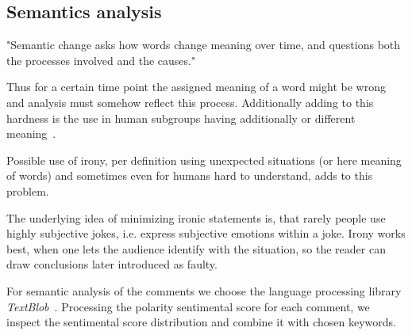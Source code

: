 \documentclass[runningheads,a4paper]{llncs}
\begin{document}
	\subsection{Semantics analysis}\label{sub:semantic}
	\begin{displayquote}
		"Semantic change asks how words change meaning over time, and questions both the processes involved and the causes."~\cite[p.2]{bouss2013}
	\end{displayquote}
	Thus for a certain time point the assigned meaning of a word might be wrong and analysis must somehow reflect this process. Additionally adding to this hardness is the use in human subgroups having additionally or different meaning~\cite[p.]{bouss2013}.\par
	Possible use of irony, per definition using unexpected situations (or here meaning of words) and sometimes even for humans hard to understand, adds to this problem.\par
	The underlying idea of minimizing ironic statements is, that rarely people use highly subjective jokes, i.e. express subjective emotions within a joke. Irony works best, when one lets the audience identify with the situation, so the reader can draw conclusions later introduced as faulty.\par
	For semantic analysis of the comments we choose the language processing library \textit{TextBlob}~\cite{textblob}. Processing the polarity sentimental score for each comment, we inspect the sentimental score distribution and combine it with chosen keywords.
\end{document}

